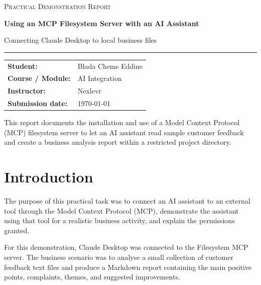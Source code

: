 \documentclass[12pt,a4paper]{article}
\newcommand{\StudentName}{Blada Chems Eddine }
\newcommand{\CourseName}{AI Integration}
\newcommand{\InstructorName}{Nexlevr}
\newcommand{\SubmissionDate}{\today}
\begin{document}
	
	\begin{titlepage}
		\centering
		\vspace*{2cm}
		{\Large\textsc{Practical Demonstration Report}\par}
		\vspace{1.2cm}
		{\huge\bfseries Using an MCP Filesystem Server with an AI Assistant\par}
		\vspace{0.7cm}
		{\Large Connecting Claude Desktop to local business files\par}
		\vspace{1.8cm}
		\rule{0.85\textwidth}{0.6pt}\par
		\vspace{1.2cm}
		\begin{tabular}{>{\bfseries}p{4cm}p{8cm}}
			Student: & \StudentName \\
			Course / Module: & \CourseName \\
			Instructor: & \InstructorName \\
			Submission date: & \SubmissionDate \\
		\end{tabular}
		\vfill
		\begin{minipage}{0.82\textwidth}
			\centering
			This report documents the installation and use of a Model Context Protocol (MCP) filesystem server to let an AI assistant read sample customer feedback and create a business analysis report within a restricted project directory.
		\end{minipage}
		\vspace{1cm}
	\end{titlepage}
	
	\tableofcontents
	\listoffigures
	\newpage
	
	\section{Introduction}
	
	The purpose of this practical task was to connect an AI assistant to an external tool through the Model Context Protocol (MCP), demonstrate the assistant using that tool for a realistic business activity, and explain the permissions granted.
	
	For this demonstration, Claude Desktop was connected to the Filesystem MCP server. The business scenario was to analyse a small collection of customer feedback text files and produce a Markdown report containing the main positive points, complaints, themes, and suggested improvements.
	
\end{document}
